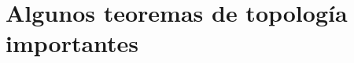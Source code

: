 \documentclass[10pt]{report}
\newcommand{\Esfera}{\mathbb{S}^2}
\newcommand{\enfatiza}[1]{\textbf{\textit{#1}}}
\theoremstyle{definition}
\newtheorem{defin}{Definición}[section]
\newtheorem{prop}[defin]{Proposición}
\begin{document}













\appendix
\chapter{Algunos teoremas de topología importantes}
\end{document}
